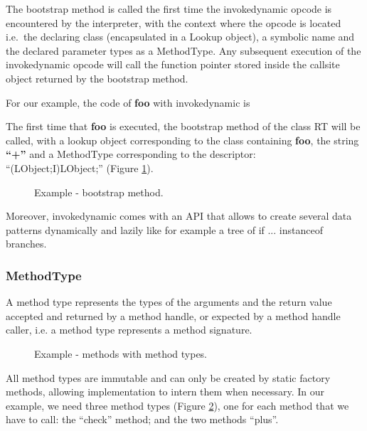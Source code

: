 \documentclass{sig-alternate}
\begin{document}
      The bootstrap method is called the first time the invokedynamic opcode is encountered by the interpreter,
      with the context where the opcode is located i.e.~the declaring class (encapsulated in a Lookup object),
      a symbolic name and the declared parameter types as a MethodType.
      Any subsequent execution of the invokedynamic opcode will call the function pointer
      stored inside the callsite object returned by the bootstrap method.
      
      For our example, the code of {\bf foo} with invokedynamic is

      

      The first time that {\bf foo} is executed, the bootstrap method of the class RT will be called, with a lookup object corresponding to the class containing {\bf foo},
      the string {\bf ``+''} and a MethodType corresponding to the descriptor:\\``(LObject;I)LObject;'' (Figure \ref{fooBSM}).

      \begin{figure}[!h]
        \centering \vspace{-1.5em}
        \caption{Example - bootstrap method.}
        \label{fooBSM}
      \end{figure}

      Moreover, invokedynamic comes with an API that allows to create several data patterns
      dynamically and lazily like for example a tree of if ... instanceof branches.

    \subsubsection{MethodType}

      A method type represents the types of the arguments and the return value accepted and returned by a method handle,
      or expected by a method handle caller, i.e. a method type represents a method signature.

      \begin{figure}[!h]
        \centering \vspace{-1.5em}
        \caption{Example - methods with method types.}
        \label{fooMTS}
      \end{figure}

      All method types are immutable and can only be created by static factory methods,
      allowing implementation to intern them when necessary. 
      In our example, we need three method types (Figure \ref{fooMTS}), one for each method that we have to call:
      the ``check'' method; and the two methods ``plus''.
\end{document}
